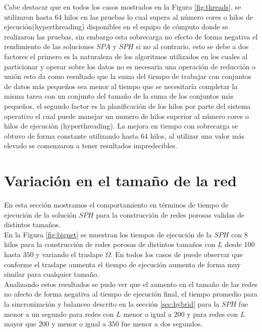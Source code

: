 \pagebreak
Cabe destacar que en todos los casos mostrados en la Figura \ref{fig:threads}, se utilizaron hasta 64 hilos en las pruebas lo cual supera al número cores o hilos de ejecución(hyperthreading) disponibles en el equipo de cómputo donde se realizaron las pruebas, sin embargo esta sobrecarga no efecto de forma negativa el rendimiento de las soluciones $SPA$ y $SPH$ si no al contrario, esto se debe a dos factores el primero es la naturaleza de los algoritmos utilizados en los cuales al particionar y operar sobre los datos no es necesaria una operación de reducción o unión esto da como resultado que la suma del tiempo de trabajar con conjuntos de datos más pequeños sea menor al tiempo que se necesitaría completar la misma tarea con un conjunto del tamaño de la suma de los conjuntos más pequeños, el segundo factor es la planificación de los hilos por parte del sistema operativo el cual puede manejar un numero de hilos superior al número cores o hilos de ejecución (hyperthreading). La mejora en tiempo con sobrecarga se obtuvo de forma constante utilizando hasta 64 hilos, al utilizar una valor más elevado se comenzaron a tener resultados impredecibles.

\section*{Variación en el tamaño de la red}
En esta sección mostramos el comportamiento en términos de tiempo de ejecución de la solución $SPH$ para la construcción de redes porosas validas de distintos tamaños.\\

En la Figura \ref{fig:bignet} se muestran los tiempos de ejecución de la $SPH$ con $8$ hilos para la construcción de redes porosas de distintos tamaños con $L$ desde $100$ hasta $350$ y variando el traslape $\Omega$. En todos los casos de puede observar que conforme el traslape aumenta el tiempo de ejecución aumenta de forma muy similar para cualquier tamaño.\\

Analizando estos resultados se pudo ver que el aumento en el tamaño de las redes no afecto de forma negativa al tiempo de ejecución final, el tiempo promedio para la sincronización y balanceo descrito en la sección \ref{sec:hybrid} para la $SPH$ fue menor a un segundo para redes con $L$ menor o igual a $200$ y para redes con $L$ mayor que $200$ y menor o igual a $350$ fue menor a dos segundos.

